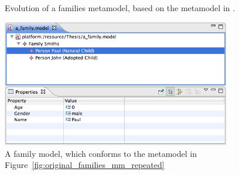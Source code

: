 \begin{figure}[htbp]
	\centering
	\caption{Evolution of a families metamodel, based on the metamodel in \cite{hutn}.}
\label{fig:families_mms_repeated}
\end{figure}

\begin{figure}[htbp]
  \begin{center}
    \leavevmode
    \includegraphics[width=10cm]{5.Implementation/images/family_model.png}
  \end{center}
  \caption[A family model]{A family model, which conforms to the metamodel in Figure~\ref{fig:original_families_mm_repeated}}
  \label{fig:families_model_repeated}
\end{figure}

